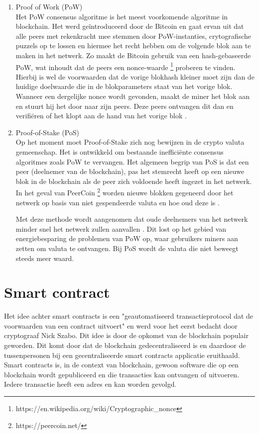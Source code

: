 \begin{enumerate}
	\item Proof of Work (PoW)\\
	Het PoW consensus algoritme is het meest voorkomende algoritme in blockchain. Het werd geïntroduceerd door de Bitcoin en gaat ervan uit dat alle peers met rekenkracht mee stemmen door PoW-instanties, crytografische puzzels op te lossen en hiermee het recht hebben om de volgende blok aan te maken in het netwerk. Zo maakt de Bitcoin gebruik van een hash-gebaseerde PoW, wat inhoudt dat de peers een nonce-waarde \footnote{https://en.wikipedia.org/wiki/Cryptographic_nonce} proberen te vinden. Hierbij is wel de voorwaarden dat de vorige blokhash kleiner moet zijn dan de huidige doelwaarde die in de blokparameters staat van het vorige blok. Wanneer een dergelijke nonce wordt gevonden, maakt de miner het blok aan en stuurt hij het door naar zijn peers. Deze peers ontvangen dit dan en verifiëren of het klopt aan de hand van het vorige blok \cite{securityPOW}.
	\item Proof-of-Stake (PoS)\\
	Op het moment moet Proof-of-Stake zich nog bewijzen in de crypto valuta gemeenschap. Het is ontwikkeld om bestaande inefficiënte consensus algoritmes zoals PoW te vervangen. Het algemeen begrip van PoS is dat een peer (deelnemer van de blockchain), pas het stemrecht heeft op een nieuwe blok in de blockchain als de peer zich voldoende heeft ingezet in het netwerk. In het geval van PeerCoin \footnote{https://peercoin.net/} worden nieuwe blokken gegeneerd door het netwerk op basis van niet gespendeerde valuta en hoe oud deze is \cite{posProtocol}.\par
	
	Met deze methode wordt aangenomen dat oude deelnemers van het netwerk minder snel het netwerk zullen aanvallen \cite{blockchainIssuesAndChallenges}. Dit lost op het gebied van energiebesparing de problemen van PoW op, waar gebruikers miners aan zetten om valuta te ontvangen. Bij PoS wordt de valuta die niet beweegt steeds meer waard.
\end{enumerate}
\newpage

\section{Smart contract}
Het idee achter smart contracts is een "geautomatiseerd transactieprotocol dat de voorwaarden van een contract uitvoert" \cite{smartContracts} en werd voor het eerst bedacht door cryptograaf Nick Szabo. Dit idee is door de opkomst van de blockchain populair geworden. Dit komt door dat de blockchain gedecentraliseerd is en daardoor de tussenpersonen bij een gecentraliseerde smart contracts applicatie eruithaald. Smart contracts is, in de context van blockchain, gewoon software die op een blockchain wordt gepubliceerd en die transacties kan ontvangen of uitvoeren. Iedere transactie heeft een adres en kan worden gevolgd. \par